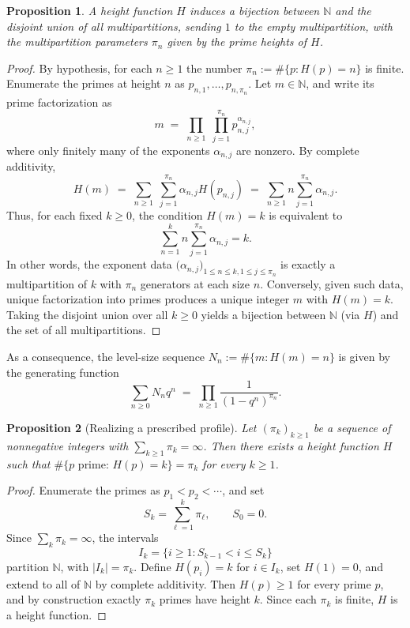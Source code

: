 \documentclass[11pt]{article}
\newtheorem{proposition}{Proposition}
\theoremstyle{definition}
\begin{document}
\begin{proposition}\label{thm:height-multipartition}
A height function $H$ induces a bijection between $\mathbb{N}$ and
the disjoint union of all multipartitions, sending $1$ to the empty multipartition, with the multipartition parameters $\pi_n$ given by the prime heights of $H$.
\end{proposition}

\begin{proof}
By hypothesis, for each $n\ge1$ the number
$\pi_n := \#\{p : H(p)=n\}$ is finite.  Enumerate the primes at height
$n$ as $p_{n,1},\dots,p_{n,\pi_n}$.  Let $m\in\mathbb{N}$, and write
its prime factorization as
\[
  m
  \;=\;
  \prod_{n\ge1}\;\prod_{j=1}^{\pi_n} p_{n,j}^{\alpha_{n,j}},
\]
where only finitely many of the exponents $\alpha_{n,j}$ are nonzero.
By complete additivity,
\[
  H(m)
  \;=\;
  \sum_{n\ge1}\;\sum_{j=1}^{\pi_n} \alpha_{n,j} H(p_{n,j})
  \;=\;
  \sum_{n\ge1} n \sum_{j=1}^{\pi_n} \alpha_{n,j}.
\]
Thus, for each fixed $k\ge0$, the condition $H(m)=k$ is equivalent to
\[
  \sum_{n=1}^k n \sum_{j=1}^{\pi_n} \alpha_{n,j} = k.
\]
In other words, the exponent data
$\bigl(\alpha_{n,j}\bigr)_{1\le n\le k, 1\le j\le\pi_n}$ is exactly a
multipartition of $k$ with $\pi_n$ generators at each size $n$.
Conversely, given such data, unique factorization into primes produces
a unique integer $m$ with $H(m)=k$.  Taking the disjoint union over
all $k\ge0$ yields a bijection between $\mathbb{N}$ (via $H$) and
the set of all multipartitions.
\end{proof}

As a consequence, the level-size sequence $N_n := \#\{m:H(m)=n\}$ is
given by the generating function
\begin{equation}\label{eq:GN}
  \sum_{n\ge0} N_n q^n
  \;=\;
  \prod_{n\ge1} \frac{1}{(1-q^n)^{\pi_n}}.
\end{equation}

\begin{proposition}[Realizing a prescribed profile]\label{prop:realize-profile}
Let $(\pi_k)_{k\ge1}$ be a sequence of nonnegative integers with $\sum_{k\ge1}\pi_k=\infty$.
Then there exists a height function $H$ such that
$\#\{p\text{ prime}:\, H(p)=k\}=\pi_k$ for every $k\ge1$.
\end{proposition}

\begin{proof}
Enumerate the primes as $p_1<p_2<\cdots$, and set
\[
  S_k=\sum_{\ell=1}^k\pi_\ell,\qquad S_0=0.
\]
Since $\sum_k\pi_k=\infty$, the intervals
\[
  I_k=\{i\ge1:S_{k-1}<i\le S_k\}
\]
partition $\mathbb N$, with $|I_k|=\pi_k$.  Define $H(p_i)=k$ for
$i\in I_k$, set $H(1)=0$, and extend to all of $\mathbb N$ by complete
additivity.  Then $H(p)\ge1$ for every prime $p$, and by construction exactly
$\pi_k$ primes have height $k$.  Since each $\pi_k$ is finite, $H$ is a height
function.
\end{proof}
\end{document}
